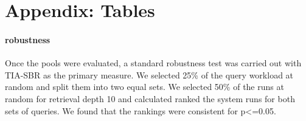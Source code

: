 \section*{Appendix: Tables}

\paragraph{robustness}
Once the pools were evaluated, a standard robustness test was carried out with TIA-SBR as the primary measure. We selected 25\% of the query workload at random and split them into two equal sets. We selected 50\% of the runs at random for retrieval depth 10 and calculated ranked the system runs for both sets of queries. We found that the rankings were consistent for p<=0.05.


\begin{table*}[!t]
  \small
  \centering
  \caption{Retrieval Effectiveness ($k$ = 20)}
  \label{tab:retrireval-effectiveness}
\end{table*}

